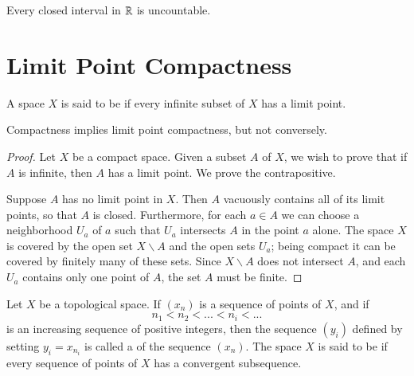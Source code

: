 \documentclass[12pt, a4paper, oneside, openright, titlepage]{book}
\begin{document}
\begin{cor}
    Every closed interval in $\mathbb R$ is uncountable.
\end{cor}


\section{Limit Point Compactness}

\begin{defn}
    A space $X$ is said to be  if every infinite subset of $X$ has a limit point.
\end{defn}

\begin{thm}
    Compactness implies limit point compactness, but not conversely.
\end{thm}
\begin{proof}
    Let $X$ be a compact space. Given a subset $A$ of $X$, we wish to prove that if $A$ is infinite, then $A$ has a limit point. We prove the contrapositive.

    Suppose $A$ has no limit point in $X$. Then $A$ vacuously contains all of its limit points, so that $A$ is closed. Furthermore, for each $a \in A$ we can choose a neighborhood $U_a$ of $a$ such that $U_a$ intersects $A$ in the point $a$ alone. The space $X$ is covered by the open set $X\backslash A$ and the open sets $U_a$; being compact it can be covered by finitely many of these sets. Since $X\backslash A$ does not intersect $A$, and each $U_a$ contains only one point of $A$, the set $A$ must be finite.
\end{proof}


\begin{defn}
    Let $X$ be a topological space. If $(x_n)$ is a sequence of points of $X$, and if \begin{equation*}
        n_1 < n_2 < ... < n_i < ...
    \end{equation*}
    is an increasing sequence of positive integers, then the sequence $(y_i)$ defined by setting $y_i = x_{n_i}$ is called a  of the sequence $(x_n)$. The space $X$ is said to be  if every sequence of points of $X$ has a convergent subsequence.
\end{defn}
\end{document}
